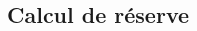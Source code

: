 \documentclass[10pt, french]{article}
\begin{document}
\begin{multicols*}{2}
%
%
%
%
%
%
%
%
%


\section{Calcul de réserve}


\end{multicols*}
\end{document}
